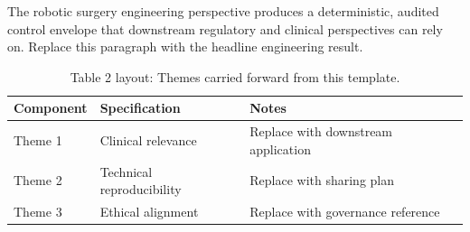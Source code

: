 
The robotic surgery engineering perspective produces a deterministic, audited control envelope that downstream regulatory and clinical perspectives can rely on. Replace this paragraph with the headline engineering result.

\begin{table}[H]
\caption{Table 2 layout: Themes carried forward from this template.}
\label{tab:conclusions_themes}
\centering
\begin{tabular}{>{\raggedright\arraybackslash}p{3.4cm} >{\raggedright\arraybackslash}p{4.6cm} >{\raggedright\arraybackslash}p{5.4cm}}
\toprule
\textbf{Component} & \textbf{Specification} & \textbf{Notes} \\
\midrule
  Theme 1 & Clinical relevance & Replace with downstream application \\
  Theme 2 & Technical reproducibility & Replace with sharing plan \\
  Theme 3 & Ethical alignment & Replace with governance reference \\
\bottomrule
\end{tabular}
\end{table}

